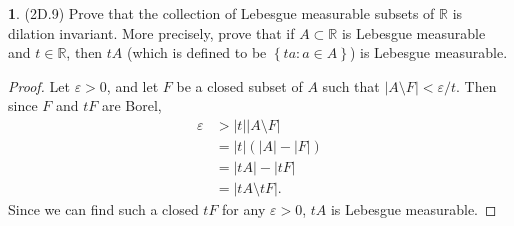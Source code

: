 \documentclass[12pt]{article}
\theoremstyle{definition}
\newtheorem{ex}{}
\begin{document}
\begin{ex}
	(2D.9)
	Prove that the collection of Lebesgue measurable subsets of $\mathbb{R}$ is dilation invariant.
	More precisely, prove that if $A \subset \mathbb{R}$ is Lebesgue measurable and $t \in \mathbb{R}$, then $tA$ (which is defined to be $\left\lbrace ta : a \in A \right\rbrace$) is Lebesgue measurable.
\end{ex}
\begin{proof}
	Let $\varepsilon > 0$, and let $F$ be a closed subset of $A$ such that $|A \setminus F| < \varepsilon/t$.
	Then since $F$ and $tF$ are Borel, \begin{align*}
		\varepsilon & > |t||A \setminus F| \\
		            & = |t|(|A| - |F|)     \\
		            & = |tA| - |tF|        \\
		            & = |tA \setminus tF|.
	\end{align*}
	Since we can find such a closed $tF$ for any $\varepsilon > 0$, $tA$ is Lebesgue measurable.
\end{proof}
\end{document}
